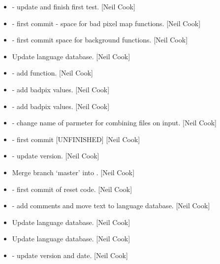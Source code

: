 \documentclass[a4paper,10pt,english]{report}
\begin{document}
\begin{itemize}
\item {} 
 - update and finish first test. {[}Neil Cook{]}

\item {} 
 - first commit - space for bad pixel map functions. {[}Neil
Cook{]}

\item {} 
 - first commit space for background functions. {[}Neil
Cook{]}

\item {} 
Update language database. {[}Neil Cook{]}

\item {} 
 - add  function. {[}Neil Cook{]}

\item {} 
 - add badpix values. {[}Neil Cook{]}

\item {} 
 - add badpix values. {[}Neil Cook{]}

\item {} 
 - change name of parmeter for combining files on
input. {[}Neil Cook{]}

\item {} 
 - first commit {[}UNFINISHED{]} {[}Neil Cook{]}

\item {} 
 - update version. {[}Neil Cook{]}

\item {} 
Merge branch ‘master’ into . {[}Neil Cook{]}

\item {} 
 - first commit of reset code. {[}Neil Cook{]}

\item {} 
 - add comments and move text to language database.
{[}Neil Cook{]}

\item {} 
Update language database. {[}Neil Cook{]}

\item {} 
Update language database. {[}Neil Cook{]}

\item {} 
 - update version and date. {[}Neil Cook{]}


\end{itemize}
\end{document}
